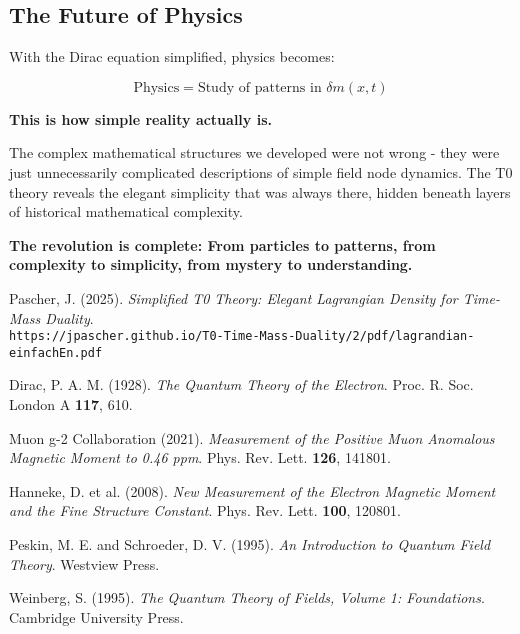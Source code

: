 \documentclass[12pt,a4paper]{article}
\newcommand{\deltam}{\delta m}
\theoremstyle{definition}
\theoremstyle{remark}
\begin{document}
	\subsection{The Future of Physics}
	
	With the Dirac equation simplified, physics becomes:
	
	\begin{equation}
		\boxed{\text{Physics} = \text{Study of patterns in } \deltam(x,t)}
	\end{equation}
	
	\textbf{This is how simple reality actually is.}
	
	The complex mathematical structures we developed were not wrong - they were just unnecessarily complicated descriptions of simple field node dynamics. The T0 theory reveals the elegant simplicity that was always there, hidden beneath layers of historical mathematical complexity.
	
	\textbf{The revolution is complete: From particles to patterns, from complexity to simplicity, from mystery to understanding.}
	
	\begin{thebibliography}{99}
		Pascher, J. (2025). \textit{Simplified T0 Theory: Elegant Lagrangian Density for Time-Mass Duality}. \\
		\texttt{https://jpascher.github.io/T0-Time-Mass-Duality/2/pdf/lagrandian-einfachEn.pdf}
		
		Dirac, P. A. M. (1928). \textit{The Quantum Theory of the Electron}. Proc. R. Soc. London A \textbf{117}, 610.
		
		Muon g-2 Collaboration (2021). \textit{Measurement of the Positive Muon Anomalous Magnetic Moment to 0.46 ppm}. Phys. Rev. Lett. \textbf{126}, 141801.
		
		Hanneke, D. et al. (2008). \textit{New Measurement of the Electron Magnetic Moment and the Fine Structure Constant}. Phys. Rev. Lett. \textbf{100}, 120801.
		
		Peskin, M. E. and Schroeder, D. V. (1995). \textit{An Introduction to Quantum Field Theory}. Westview Press.
		
		Weinberg, S. (1995). \textit{The Quantum Theory of Fields, Volume 1: Foundations}. Cambridge University Press.
	\end{thebibliography}
	
\end{document}
